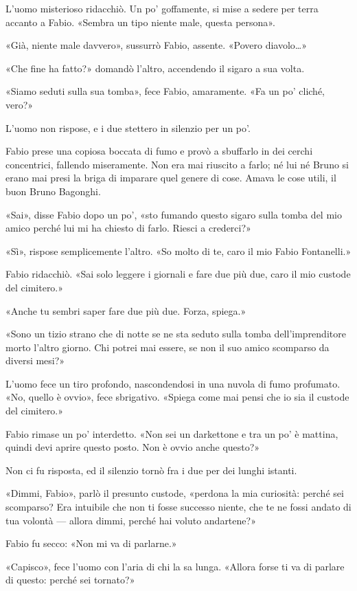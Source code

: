 L'uomo misterioso ridacchiò. Un po' goffamente, si mise a sedere per
terra accanto a Fabio. «Sembra un tipo niente male, questa persona».

«Già, niente male davvero», sussurrò Fabio, assente. «Povero
diavolo\ldots{}»

«Che fine ha fatto?» domandò l'altro, accendendo il sigaro a sua volta.

«Siamo seduti sulla sua tomba», fece Fabio, amaramente. «Fa un po'
cliché, vero?»

L'uomo non rispose, e i due stettero in silenzio per un po'.

Fabio prese una copiosa boccata di fumo e provò a sbuffarlo in dei
cerchi concentrici, fallendo miseramente. Non era mai riuscito a farlo;
né lui né Bruno si erano mai presi la briga di imparare quel genere di
cose. Amava le cose utili, il buon Bruno Bagonghi.

«Sai», disse Fabio dopo un po', «sto fumando questo sigaro sulla tomba
del mio amico perché lui mi ha chiesto di farlo. Riesci a crederci?»

«Sì», rispose semplicemente l'altro. «So molto di te, caro il mio Fabio
Fontanelli.»

Fabio ridacchiò. «Sai solo leggere i giornali e fare due più due, caro
il mio custode del cimitero.»

«Anche tu sembri saper fare due più due. Forza, spiega.»

«Sono un tizio strano che di notte se ne sta seduto sulla tomba
dell'imprenditore morto l'altro giorno. Chi potrei mai essere, se non il
suo amico scomparso da diversi mesi?»

L'uomo fece un tiro profondo, nascondendosi in una nuvola di fumo
profumato. «No, quello è ovvio», fece sbrigativo. «Spiega come mai pensi
che io sia il custode del cimitero.»

Fabio rimase un po' interdetto. «Non sei un darkettone e tra un po' è
mattina, quindi devi aprire questo posto. Non è ovvio anche questo?»

Non ci fu risposta, ed il silenzio tornò fra i due per dei lunghi
istanti.

«Dimmi, Fabio», parlò il presunto custode, «perdona la mia curiosità:
perché sei scomparso? Era intuibile che non ti fosse successo niente,
che te ne fossi andato di tua volontà --- allora dimmi, perché hai
voluto andartene?»

Fabio fu secco: «Non mi va di parlarne.»

«Capisco», fece l'uomo con l'aria di chi la sa lunga. «Allora forse ti
va di parlare di questo: perché sei tornato?»

